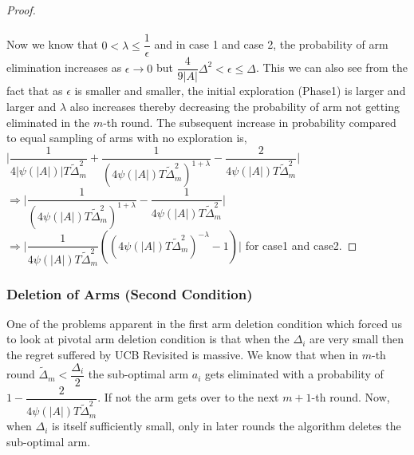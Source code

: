 \begin{proof}
\paragraph*{}Now we know that $ 0 < \lambda \leq \dfrac{1}{\epsilon}$ and in case 1 and case 2, the probability of arm elimination increases as $\epsilon \rightarrow 0$  but $\dfrac{4}{9|A|}\Delta^{2}<\epsilon\leq \Delta$. %
This we can also see from the fact that as $\epsilon$ is smaller and smaller, the initial exploration (Phase1) is larger and larger and $\lambda$ also increases thereby decreasing the probability of arm not getting eliminated in the $m$-th round. The subsequent increase in probability compared to equal sampling of arms with no exploration is, 
\newline
$\bigg |\dfrac{1}{4|\psi(|A|)|T\tilde{\Delta}_{m}^{2}} + \dfrac{1}{(4\psi(|A|)T\tilde{\Delta}_{m}^{2})^{1+\lambda}} - \dfrac{2}{4\psi(|A|)T\tilde{\Delta}_{m}^{2}}\bigg | $ $\Rightarrow\bigg |\dfrac{1}{(4\psi(|A|)T\tilde{\Delta}_{m}^{2})^{1+\lambda}} - \dfrac{1}{4\psi(|A|)T\tilde{\Delta}_{m}^{2}}\bigg |$ 
\newline
\hspace*{18em}$\Rightarrow\bigg |\dfrac{1}{4\psi(|A|)T\tilde{\Delta}_{m}^{2}}( (4\psi(|A|)T\tilde{\Delta}_{m}^{2})^{-\lambda}-1)\bigg |$ for case1 and case2.


\end{proof}


\subsubsection{Deletion of Arms (Second Condition)}

One of the problems apparent in the first arm deletion condition which forced us to look at pivotal arm deletion condition is that when the $\Delta_{i}$ are very small then the regret suffered by UCB Revisited is massive. We know that when in $m$-th round $\tilde{\Delta}_{m} < \dfrac{\Delta_{i}}{2}$ the sub-optimal arm $a_{i}$ gets eliminated with a probability of $1-\dfrac{2}{4\psi(|A|)T\tilde{\Delta}_{m}^{2}}$. If not the arm gets over to the next $m+1$-th round. Now, when $\Delta_{i}$ is itself sufficiently small, only in later rounds the algorithm deletes the sub-optimal arm.
